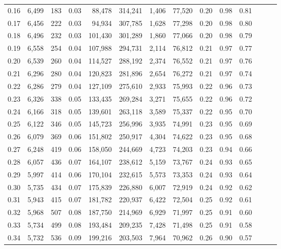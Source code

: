 \begin{tabular}{rrrrrrrrrrrrrr}
0.16 &  6,499 &    183 &  0.03 &   88,478 &  314,241 &   1,406 &  77,520 &  0.20 &  0.98 &      0.81 \\
0.17 &  6,456 &    222 &  0.03 &   94,934 &  307,785 &   1,628 &  77,298 &  0.20 &  0.98 &      0.80 \\
0.18 &  6,496 &    232 &  0.03 &  101,430 &  301,289 &   1,860 &  77,066 &  0.20 &  0.98 &      0.79 \\
0.19 &  6,558 &    254 &  0.04 &  107,988 &  294,731 &   2,114 &  76,812 &  0.21 &  0.97 &      0.77 \\
0.20 &  6,539 &    260 &  0.04 &  114,527 &  288,192 &   2,374 &  76,552 &  0.21 &  0.97 &      0.76 \\
0.21 &  6,296 &    280 &  0.04 &  120,823 &  281,896 &   2,654 &  76,272 &  0.21 &  0.97 &      0.74 \\
0.22 &  6,286 &    279 &  0.04 &  127,109 &  275,610 &   2,933 &  75,993 &  0.22 &  0.96 &      0.73 \\
0.23 &  6,326 &    338 &  0.05 &  133,435 &  269,284 &   3,271 &  75,655 &  0.22 &  0.96 &      0.72 \\
0.24 &  6,166 &    318 &  0.05 &  139,601 &  263,118 &   3,589 &  75,337 &  0.22 &  0.95 &      0.70 \\
0.25 &  6,122 &    346 &  0.05 &  145,723 &  256,996 &   3,935 &  74,991 &  0.23 &  0.95 &      0.69 \\
0.26 &  6,079 &    369 &  0.06 &  151,802 &  250,917 &   4,304 &  74,622 &  0.23 &  0.95 &      0.68 \\
0.27 &  6,248 &    419 &  0.06 &  158,050 &  244,669 &   4,723 &  74,203 &  0.23 &  0.94 &      0.66 \\
0.28 &  6,057 &    436 &  0.07 &  164,107 &  238,612 &   5,159 &  73,767 &  0.24 &  0.93 &      0.65 \\
0.29 &  5,997 &    414 &  0.06 &  170,104 &  232,615 &   5,573 &  73,353 &  0.24 &  0.93 &      0.64 \\
0.30 &  5,735 &    434 &  0.07 &  175,839 &  226,880 &   6,007 &  72,919 &  0.24 &  0.92 &      0.62 \\
0.31 &  5,943 &    415 &  0.07 &  181,782 &  220,937 &   6,422 &  72,504 &  0.25 &  0.92 &      0.61 \\
0.32 &  5,968 &    507 &  0.08 &  187,750 &  214,969 &   6,929 &  71,997 &  0.25 &  0.91 &      0.60 \\
0.33 &  5,734 &    499 &  0.08 &  193,484 &  209,235 &   7,428 &  71,498 &  0.25 &  0.91 &      0.58 \\
0.34 &  5,732 &    536 &  0.09 &  199,216 &  203,503 &   7,964 &  70,962 &  0.26 &  0.90 &      0.57 \\

\end{tabular}
